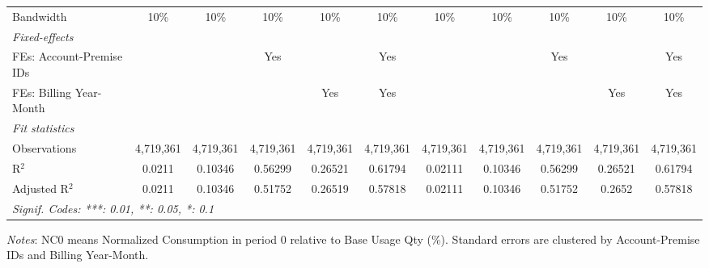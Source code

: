 \begin{table}[htbp]
\begin{adjustbox}{scale = 0.75}
\begin{tabular}{lcccccccccc}
& & & & & & & & & & \\
\midrule Bandwidth & 10\% & 10\% & 10\% & 10\% & 10\% & 10\% & 10\% & 10\% & 10\% & 10\%\\
\midrule
\emph{Fixed-effects}&   &   &   &   &   &   &   &   &   &  \\
FEs: Account-Premise IDs &  &  & Yes &  & Yes &  &  & Yes &  & Yes\\
FEs: Billing Year-Month &  &  &  & Yes & Yes &  &  &  & Yes & Yes\\
\midrule
\emph{Fit statistics}&  & & & & & & & & & \\
Observations & 4,719,361&4,719,361&4,719,361&4,719,361&4,719,361&4,719,361&4,719,361&4,719,361&4,719,361&4,719,361\\
R$^2$ & 0.0211&0.10346&0.56299&0.26521&0.61794&0.02111&0.10346&0.56299&0.26521&0.61794\\
Adjusted R$^2$ & 0.0211&0.10346&0.51752&0.26519&0.57818&0.02111&0.10346&0.51752&0.2652&0.57818\\
\bottomrule\bottomrule
\multicolumn{11}{l}{\emph{Signif. Codes: ***: 0.01, **: 0.05, *: 0.1}}\\
\end{tabular}
\end{adjustbox}
\begin{tablenotes}
\footnotesize
\emph{\medskip Notes}: NC0 means Normalized Consumption in period 0 relative to Base Usage Qty (\%). Standard errors are clustered by Account-Premise IDs and Billing Year-Month.
\end{tablenotes}
\end{table}